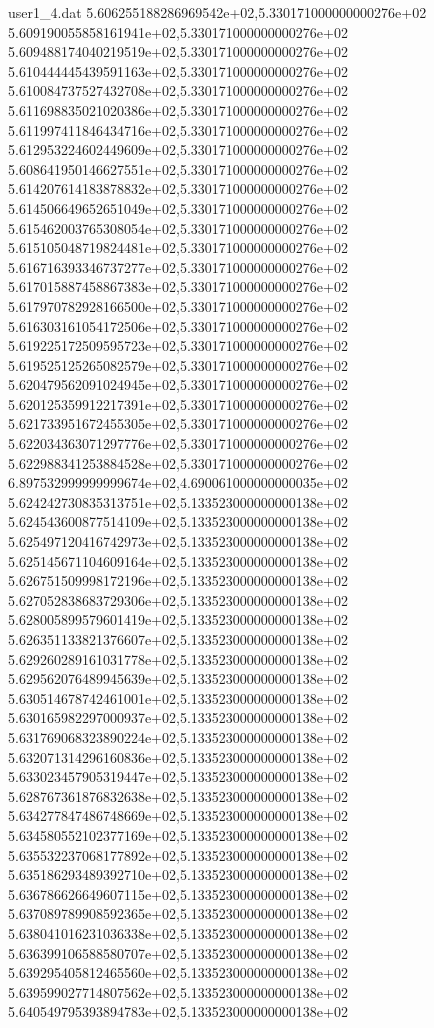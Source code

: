 \begin{filecontents}{user1_4.dat}
5.606255188286969542e+02,5.330171000000000276e+02
5.609190055858161941e+02,5.330171000000000276e+02
5.609488174040219519e+02,5.330171000000000276e+02
5.610444445439591163e+02,5.330171000000000276e+02
5.610084737527432708e+02,5.330171000000000276e+02
5.611698835021020386e+02,5.330171000000000276e+02
5.611997411846434716e+02,5.330171000000000276e+02
5.612953224602449609e+02,5.330171000000000276e+02
5.608641950146627551e+02,5.330171000000000276e+02
5.614207614183878832e+02,5.330171000000000276e+02
5.614506649652651049e+02,5.330171000000000276e+02
5.615462003765308054e+02,5.330171000000000276e+02
5.615105048719824481e+02,5.330171000000000276e+02
5.616716393346737277e+02,5.330171000000000276e+02
5.617015887458867383e+02,5.330171000000000276e+02
5.617970782928166500e+02,5.330171000000000276e+02
5.616303161054172506e+02,5.330171000000000276e+02
5.619225172509595723e+02,5.330171000000000276e+02
5.619525125265082579e+02,5.330171000000000276e+02
5.620479562091024945e+02,5.330171000000000276e+02
5.620125359912217391e+02,5.330171000000000276e+02
5.621733951672455305e+02,5.330171000000000276e+02
5.622034363071297776e+02,5.330171000000000276e+02
5.622988341253884528e+02,5.330171000000000276e+02
6.897532999999999674e+02,4.690061000000000035e+02
5.624242730835313751e+02,5.133523000000000138e+02
5.624543600877514109e+02,5.133523000000000138e+02
5.625497120416742973e+02,5.133523000000000138e+02
5.625145671104609164e+02,5.133523000000000138e+02
5.626751509998172196e+02,5.133523000000000138e+02
5.627052838683729306e+02,5.133523000000000138e+02
5.628005899579601419e+02,5.133523000000000138e+02
5.626351133821376607e+02,5.133523000000000138e+02
5.629260289161031778e+02,5.133523000000000138e+02
5.629562076489945639e+02,5.133523000000000138e+02
5.630514678742461001e+02,5.133523000000000138e+02
5.630165982297000937e+02,5.133523000000000138e+02
5.631769068323890224e+02,5.133523000000000138e+02
5.632071314296160836e+02,5.133523000000000138e+02
5.633023457905319447e+02,5.133523000000000138e+02
5.628767361876832638e+02,5.133523000000000138e+02
5.634277847486748669e+02,5.133523000000000138e+02
5.634580552102377169e+02,5.133523000000000138e+02
5.635532237068177892e+02,5.133523000000000138e+02
5.635186293489392710e+02,5.133523000000000138e+02
5.636786626649607115e+02,5.133523000000000138e+02
5.637089789908592365e+02,5.133523000000000138e+02
5.638041016231036338e+02,5.133523000000000138e+02
5.636399106588580707e+02,5.133523000000000138e+02
5.639295405812465560e+02,5.133523000000000138e+02
5.639599027714807562e+02,5.133523000000000138e+02
5.640549795393894783e+02,5.133523000000000138e+02

\end{filecontents}
